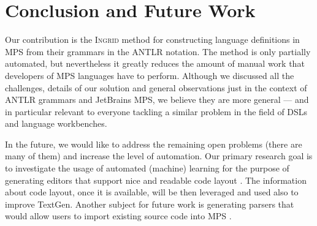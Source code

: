 \section{Conclusion and Future Work}

Our contribution is the \textsc{Ingrid} method for constructing language definitions in MPS from their grammars in the ANTLR notation.
The method is only partially automated, but nevertheless it greatly reduces the amount of manual work  that developers of MPS languages have to perform.
Although we discussed all the challenges, details of our solution and general observations just in the context of ANTLR grammars and JetBrains MPS, we believe they are more general  --- and in particular relevant to everyone tackling a similar problem in the field of DSLs and language workbenches.

In the future, we would like to address the remaining open problems (there are many of them)  and increase the level of automation.
Our primary research goal is to investigate the usage of automated (machine) learning for the purpose of generating editors that support nice and readable code layout .
The information about code layout, once it is available, will be then leveraged and used also to improve TextGen.
Another subject for future work is generating parsers that would allow users to import existing source code into MPS .


